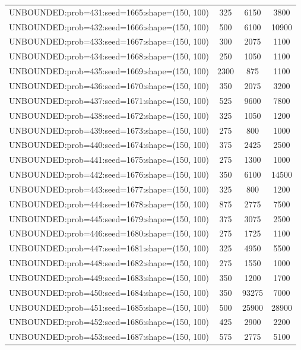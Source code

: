 \begin{longtable}{lccc}
UNBOUNDED:prob=431:seed=1665:shape=(150, 100) &      325 &  6150 &   3800 \\
UNBOUNDED:prob=432:seed=1666:shape=(150, 100) &      500 &  6100 &  10900 \\
UNBOUNDED:prob=433:seed=1667:shape=(150, 100) &      300 &  2075 &   1100 \\
UNBOUNDED:prob=434:seed=1668:shape=(150, 100) &      250 &  1050 &   1100 \\
UNBOUNDED:prob=435:seed=1669:shape=(150, 100) &     2300 &   875 &   1100 \\
UNBOUNDED:prob=436:seed=1670:shape=(150, 100) &      350 &  2075 &   3200 \\
UNBOUNDED:prob=437:seed=1671:shape=(150, 100) &      525 &  9600 &   7800 \\
UNBOUNDED:prob=438:seed=1672:shape=(150, 100) &      325 &  1050 &   1200 \\
UNBOUNDED:prob=439:seed=1673:shape=(150, 100) &      275 &   800 &   1000 \\
UNBOUNDED:prob=440:seed=1674:shape=(150, 100) &      375 &  2425 &   2500 \\
UNBOUNDED:prob=441:seed=1675:shape=(150, 100) &      275 &  1300 &   1000 \\
UNBOUNDED:prob=442:seed=1676:shape=(150, 100) &      350 &  6100 &  14500 \\
UNBOUNDED:prob=443:seed=1677:shape=(150, 100) &      325 &   800 &   1200 \\
UNBOUNDED:prob=444:seed=1678:shape=(150, 100) &      875 &  2775 &   7500 \\
UNBOUNDED:prob=445:seed=1679:shape=(150, 100) &      375 &  3075 &   2500 \\
UNBOUNDED:prob=446:seed=1680:shape=(150, 100) &      275 &  1725 &   1100 \\
UNBOUNDED:prob=447:seed=1681:shape=(150, 100) &      325 &  4950 &   5500 \\
UNBOUNDED:prob=448:seed=1682:shape=(150, 100) &      275 &  1550 &   1000 \\
UNBOUNDED:prob=449:seed=1683:shape=(150, 100) &      350 &  1200 &   1700 \\
UNBOUNDED:prob=450:seed=1684:shape=(150, 100) &      350 & 93275 &   7000 \\
UNBOUNDED:prob=451:seed=1685:shape=(150, 100) &      500 & 25900 &  28900 \\
UNBOUNDED:prob=452:seed=1686:shape=(150, 100) &      425 &  2900 &   2200 \\
UNBOUNDED:prob=453:seed=1687:shape=(150, 100) &      575 &  2775 &   5100 \\

\end{longtable}
